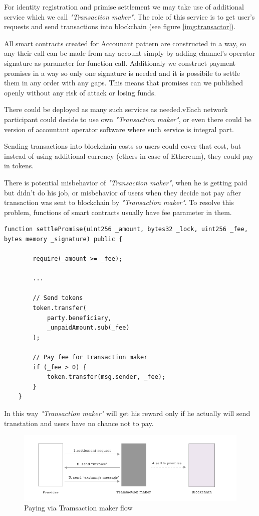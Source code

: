 \documentclass[a4paper,12pt]{article}
\begin{document}
For identity registration and primise settlement we may take use of additional
service which we call \textit{"Transaction maker"}. The role of this service is 
to get user's requests and send transactions into blockchain (see figure 
\ref{img:transactor}).

All smart contracts created for Accounant pattern are constructed in a way, so
any their call can be made from any account simply by adding channel's operator
signature as parameter for function call. Additionaly we construct payment 
promises in a way so only one signature is needed and it is possibile to settle 
them in any order with any gaps. This means that promises can we published 
openly without any risk of attack or losing funds.

There could be deployed as many such services as needed.vEach network participant 
could decide to use own \textit{"Transaction maker"}, or even there could be 
version of accountant operator software where such service is integral part.

Sending transactions into blockchain costs so users could cover that cost, but
instead of using additional currency (ethers in case of Ethereum), they could
pay in tokens.

There is potential misbehavior of \textit{"Transaction maker"}, when he is
getting paid but didn't do his job, or misbehavior of users when they decide
not pay after transaction was sent to blockchain by \textit{"Transaction 
maker"}. To resolve this problem, functions of smart contracts usually have fee
parameter in them.

\begin{lstlisting}[language=Solidity]
    function settlePromise(uint256 _amount, bytes32 _lock, uint256 _fee, bytes memory _signature) public {

        require(_amount >= _fee);
        
        ...

        // Send tokens
        token.transfer(
            party.beneficiary, 
            _unpaidAmount.sub(_fee)
        );

        // Pay fee for transaction maker
        if (_fee > 0) {
            token.transfer(msg.sender, _fee);
        }
    }
\end{lstlisting}

In this way \textit{"Transaction maker"} will get his reward only if he actually 
will send transtation and users have no chance not to pay.

\begin{figure}[H]
    \centering
    \includegraphics[scale=0.5]{../img/transactor-payment}
    \caption{Paying via Tramsaction maker flow}
    \label{img:transactor-payment}
\end{figure}
\end{document}
